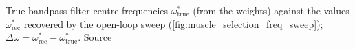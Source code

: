 True bandpass-filter centre frequencies $\omega^*_\mathrm{true}$ (from the \BMI weights) against the values $\omega^*_\mathrm{rec}$ recovered by the open-loop sweep (\autoref{fig:muscle_selection_freq_sweep}); $\Delta\omega = \omega^*_\mathrm{rec} - \omega^*_\mathrm{true}$. \href{https://github.com/tahmidazam/gg4/blob/main/notebooks/muscle_selection_freq_sweep/muscle_selection_freq_sweep.ipynb}{\underline{Source}}%